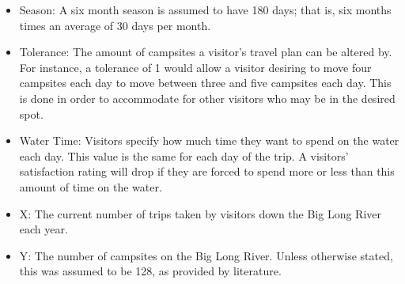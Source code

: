 \documentclass[11pt]{article} %
\begin{document}
\begin{itemize}
\item Season: A six month season is assumed to have 180 days; that is,
six months times an average of 30 days per month.

\item Tolerance: The amount of campsites a visitor's travel plan can be
altered by. For instance, a tolerance of 1 would allow a visitor desiring
to move four campsites each day to move between three and five campsites
each day. This is done in order to accommodate for other visitors who may
be in the desired spot.

\item Water Time: Visitors specify how much time they want to spend on the
water each day. This value is the same for each day of the trip. A visitors'
satisfaction rating will drop if they are forced to spend
more or less than this amount of time on the water.

\item X: The current number of trips taken by visitors down the Big Long River
each year.

\item Y: The number of campsites on the Big Long River. Unless otherwise stated,
this was assumed to be 128, as provided by literature\cite{NumCampsites}.
\end{itemize}
\end{document}
